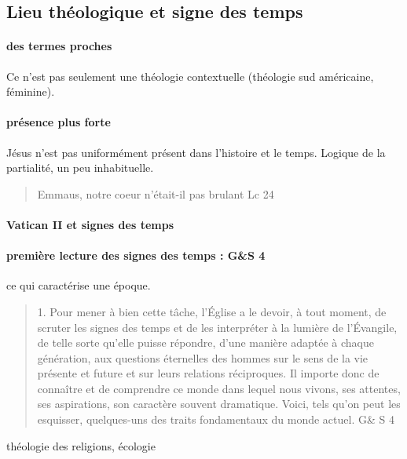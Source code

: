 \subsection{Lieu théologique et signe des temps}

\paragraph{des termes proches}
Ce n'est pas seulement une théologie contextuelle (théologie sud américaine, féminine).
\paragraph{présence plus forte}
Jésus n'est pas uniformément présent dans l'histoire et le temps. Logique de la partialité, un peu inhabituelle. 
\begin{quote}
    Emmaus, notre coeur n'était-il pas brulant
    Lc 24
\end{quote}


\paragraph{Vatican II et signes des temps}
 


\paragraph{première lecture des signes des temps : G\&S 4} ce qui caractérise une époque.

\begin{quote}
    1. Pour mener à bien cette tâche, l’Église a le devoir, à tout moment, de scruter les signes des temps et de les interpréter à la lumière de l’Évangile, de telle sorte qu’elle puisse répondre, d’une manière adaptée à chaque génération, aux questions éternelles des hommes sur le sens de la vie présente et future et sur leurs relations réciproques. Il importe donc de connaître et de comprendre ce monde dans lequel nous vivons, ses attentes, ses aspirations, son caractère souvent dramatique. Voici, tels qu’on peut les esquisser, quelques-uns des traits fondamentaux du monde actuel. G\& S 4
\end{quote}

\begin{Ex}
    théologie des religions, écologie
\end{Ex}

